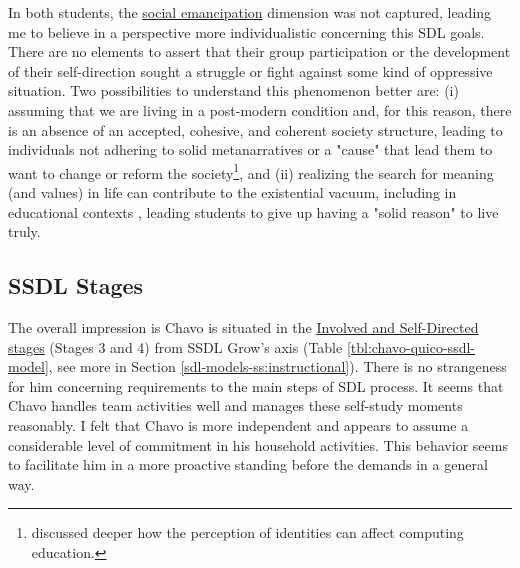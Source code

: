 In both students, the \underline{social emancipation} dimension was not captured, leading me to believe in a perspective more individualistic concerning this \gls{SDL} goals. There are no elements to assert that their group participation or the development of their self-direction sought a struggle or fight against some kind of oppressive situation. Two possibilities to understand this phenomenon better are: (i) assuming that we are living in a post-modern condition and, for this reason, there is an absence of an accepted, cohesive, and coherent society structure, leading to individuals not adhering to solid metanarratives or a "cause" that lead them to want to change or reform the society\footnote{ discussed deeper how the perception of identities can affect computing education.}, and (ii) realizing the search for meaning (and values) in life can contribute to the existential vacuum, including in educational contexts \cite{csanli:2021}, leading students to give up having a "solid reason" to live truly.

\subsection{SSDL Stages}
\label{disc-ss:staged-sdl}

The overall impression is Chavo is situated in the \underline{Involved and Self-Directed stages} (Stages 3 and 4) from \gls{SSDL} Grow's axis (Table \ref{tbl:chavo-quico-ssdl-model}, see more in Section \ref{sdl-models-ss:instructional}). There is no strangeness for him concerning requirements to the main steps of \gls{SDL} process. It seems that Chavo handles team activities well and manages these self-study moments reasonably. I felt that Chavo is more independent and appears to assume a considerable level of commitment in his household activities. This behavior seems to facilitate him in a more proactive standing before the demands in a general way. 

\renewcommand\fbox{\fcolorbox{white}{gray!30}}

